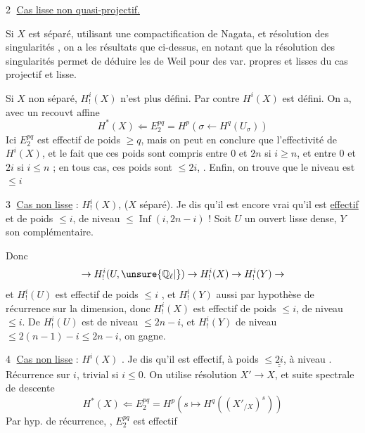 \textcircled{2} \uline{Cas  lisse non quasi-projectif.}

Si $X$ est séparé, utilisant une compactification de Nagata, et résolution des singularités , on a les  résultats que ci-dessus, en notant que la résolution des singularités permet de déduire les  de Weil pour des var. propres et lisses du cas projectif et lisse.

Si $X$ non séparé, $H^i_!(X)$ n'est plus défini. Par contre $H^i(X)$ est défini. On a, avec un recouvt affine
\[
 H^*(X)\Longleftarrow E^{pq}_2=H^p(\sigma\longleftarrow H^q(U_\sigma))
\]
Ici $E^{pq}_2$ est effectif de poids $\ge q$, mais  on peut en conclure que l'effectivité de $H^i(X)$, et le fait que ces poids sont compris entre $0$ et $2n$ si $i\ge n$, et entre $0$ et $2i$ si $i\le n$ ; en tous cas, ces poids sont $\le 2i$, . Enfin, on trouve que le niveau est $\le i$ 


\textcircled{3} \uline{Cas non lisse} : $H^i_!(X)$, ($X$ séparé). Je dis qu'il est encore vrai qu'il est \uline{effectif} et de poids $\le i$, de niveau $\le\operatorname{Inf}(i,2n-i)$ ! Soit $U$ un ouvert lisse dense, $Y$ son complémentaire.

Donc
\[
 \to H^i_!(U,\unsure{\mathbb Q_\ell|{}})\to H^i_!(X)\to H^i_!(Y)\to
\]
et $H^i_!(U)$ est effectif de poids $\le i$ , et $H^i_!(Y)$ aussi par hypothèse de récurrence sur la dimension, donc $H^i_!(X)$ est effectif de poids $\le i$, de niveau $\le i$. De  $H^i_!(U)$ est de niveau $\le 2n-i$, et $H^i_!(Y)$ de niveau $\le 2(n-1)-i\le 2n-i$, on gagne.

\textcircled{4} \uline{Cas non lisse} : $H^i(X)$ . Je dis qu'il est effectif, à poids $\le\underline{\underline{2i}}$, à niveau  .  Récurrence sur $i$, trivial si $i\le 0$. On utilise résolution $X'\to X$, et suite spectrale de descente
\[
 H^*(X)\Longleftarrow E_2^{pq}=H^p(s\longmapsto H^q((X'_{/X})^s))
\]
 Par hyp. de récurrence,  , $E_2^{pq}$ est effectif
